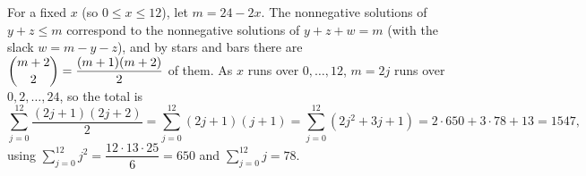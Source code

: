 For a fixed $x$ (so $0\le x\le12$), let $m=24-2x$. The nonnegative solutions of $y+z\le m$ correspond to the nonnegative solutions of $y+z+w=m$ (with the slack $w=m-y-z$), and by stars and bars there are $\dbinom{m+2}{2}=\dfrac{(m+1)(m+2)}{2}$ of them. As $x$ runs over $0,\dots,12$, $m=2j$ runs over $0,2,\dots,24$, so the total is
\[\sum_{j=0}^{12}\dfrac{(2j+1)(2j+2)}{2}=\sum_{j=0}^{12}(2j+1)(j+1)=\sum_{j=0}^{12}\left(2j^2+3j+1\right)=2\cdot650+3\cdot78+13=\boxed{1547},\]
using $\sum_{j=0}^{12}j^2=\dfrac{12\cdot13\cdot25}{6}=650$ and $\sum_{j=0}^{12}j=78$.
